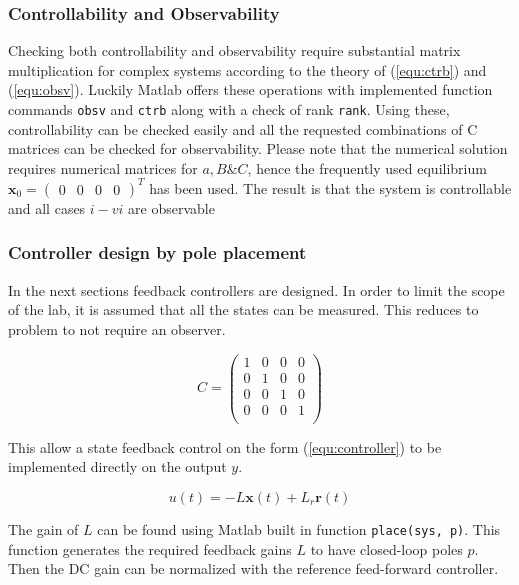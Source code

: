 \documentclass[a4paper, titlepage]{article}
\begin{document}
\subsubsection{Controllability and Observability}
Checking both controllability and observability require substantial matrix multiplication for complex systems according to the theory of (\ref{equ:ctrb}) and (\ref{equ:obsv}).
Luckily Matlab offers these operations with implemented function commands \verb|obsv| and \verb|ctrb| along with a check of rank \verb|rank|.
Using these, controllability can be checked easily and all the requested combinations of C matrices can be checked for observability.
Please note that the numerical solution requires numerical matrices for $a, B \& C$, hence the frequently used equilibrium $\textbf{x}_0 = \begin{pmatrix} 0 & 0 & 0 & 0 \end{pmatrix}^T$ has been used.
The result is that the system is controllable and all cases $i - vi$ are observable

\subsubsection{Controller design by pole placement}
In the next sections feedback controllers are designed.
In order to limit the scope of the lab, it is assumed that all the states can be measured.
This reduces to problem to not require an observer.

\begin{equation}
C = \begin{pmatrix}
1 & 0 & 0 & 0 \\
0 & 1 & 0 & 0 \\
0 & 0 & 1 & 0 \\
0 & 0 & 0 & 1 \\ 
\end{pmatrix}
\end{equation}

This allow a state feedback control on the form (\ref{equ:controller}) to be implemented directly on the output $y$.

\begin{equation}
u(t) = -L\textbf{x}(t) + L_r\textbf{r}(t)
\label{equ:controller}
\end{equation}

The gain of $L$ can be found using Matlab built in function \verb|place(sys, p)|.
This function generates the required feedback gains $L$ to have closed-loop poles $p$.
Then the DC gain can be normalized with the reference feed-forward controller.
\end{document}
